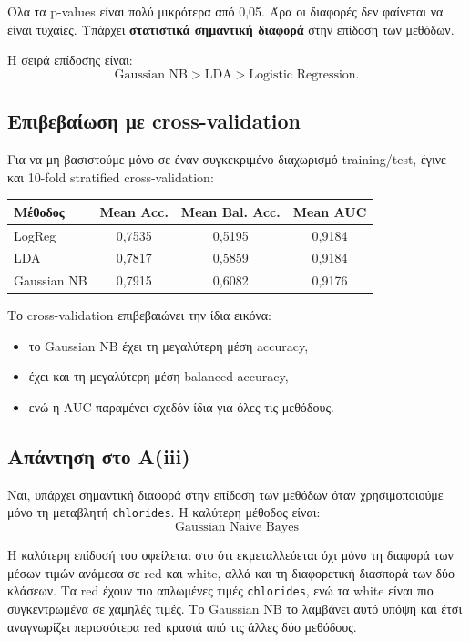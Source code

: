 \documentclass[11pt,a4paper]{article}
\newcommand{\code}[1]{\texttt{#1}}
\begin{document}
Όλα τα p-values είναι πολύ μικρότερα από 0,05. Άρα οι διαφορές δεν φαίνεται
να είναι τυχαίες. Υπάρχει \textbf{στατιστικά σημαντική διαφορά} στην επίδοση
των μεθόδων.

Η σειρά επίδοσης είναι:
\[
\text{Gaussian NB}
>
\text{LDA}
>
\text{Logistic Regression}.
\]

\subsection{Επιβεβαίωση με cross-validation}

Για να μη βασιστούμε μόνο σε έναν συγκεκριμένο διαχωρισμό training/test,
έγινε και 10-fold stratified cross-validation:

\begin{center}
{\small
\begin{tabular}{lccc}
\toprule
Μέθοδος & Mean Acc. & Mean Bal. Acc. & Mean AUC \\
\midrule
LogReg & 0,7535 & 0,5195 & 0,9184 \\
LDA & 0,7817 & 0,5859 & 0,9184 \\
Gaussian NB & 0,7915 & 0,6082 & 0,9176 \\
\bottomrule
\end{tabular}
}
\end{center}

Το cross-validation επιβεβαιώνει την ίδια εικόνα:
\begin{itemize}
    \item το Gaussian NB έχει τη μεγαλύτερη μέση accuracy,
    \item έχει και τη μεγαλύτερη μέση balanced accuracy,
    \item ενώ η AUC παραμένει σχεδόν ίδια για όλες τις μεθόδους.
\end{itemize}

\subsection{Απάντηση στο Α(iii)}

Ναι, υπάρχει σημαντική διαφορά στην επίδοση των μεθόδων όταν χρησιμοποιούμε
μόνο τη μεταβλητή \code{chlorides}. Η καλύτερη μέθοδος είναι:
\[
\boxed{\text{Gaussian Naive Bayes}}
\]

Η καλύτερη επίδοσή του οφείλεται στο ότι εκμεταλλεύεται όχι μόνο τη διαφορά
των μέσων τιμών ανάμεσα σε red και white, αλλά και τη διαφορετική διασπορά
των δύο κλάσεων. Τα red έχουν πιο απλωμένες τιμές \code{chlorides}, ενώ τα
white είναι πιο συγκεντρωμένα σε χαμηλές τιμές. Το Gaussian NB το λαμβάνει
αυτό υπόψη και έτσι αναγνωρίζει περισσότερα red κρασιά από τις άλλες δύο
μεθόδους.
\end{document}
